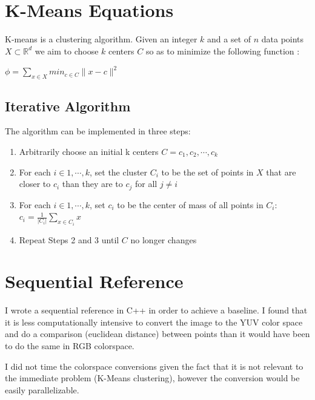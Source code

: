 \documentclass[11pt]{article}
\begin{document}
\maketitle

\section{K-Means Equations}

K-means is a clustering algorithm. Given an integer $k$ and a set of $n$ data points $X \subset \mathbb{R}^d$ we aim to choose $k$ centers $C$ so as to minimize the following function \cite{arthur}:
\newline

\begin{math}
\phi = \displaystyle\sum_{x \in X} min_{c \in C }\| x - c \|^2
\end{math}

\subsection{Iterative Algorithm}
The algorithm can be implemented in three steps:

\begin{enumerate}
\item Arbitrarily choose an initial k centers $C = {c_1, c_2, \cdots, c_k}$
\item For each $i \in {1, \cdots, k}$, set the cluster $C_i$ to be the set of points in $X$ that are closer to $c_i$ than they are to $c_j$ for all $j \neq i$
\item For each $i \in {1, \cdots, k}$, set $c_i$ to be the center of mass of all points in $C_i$: $c_i = \frac{1}{|C_i|}\sum_{x \in C_i}x$
\item Repeat Steps 2 and 3 until $C$ no longer changes
\end{enumerate}

\section{Sequential Reference}

I wrote a sequential reference in C++ in order to achieve a baseline. I found that
it is less computationally intensive to convert the image to the YUV color space and
do a comparison (euclidean distance) between points than it would have been to do
the same in RGB colorspace. 

I did not time the colorspace conversions given the fact that it is not relevant to the
immediate problem (K-Means clustering), however the conversion would be easily 
parallelizable. 
\end{document}
